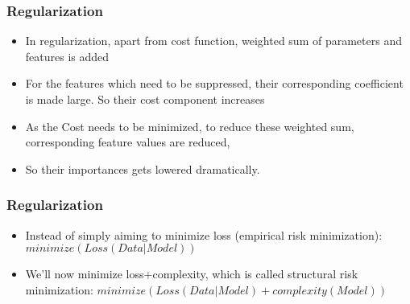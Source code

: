 	

\begin{frame}[fragile]\frametitle{Regularization}
	\begin{itemize}
	\item In regularization, apart from cost function, weighted sum of parameters and features is added
	\item For the features which need to be suppressed, their corresponding coefficient is made large. So their cost component increases
	\item As the Cost needs to be minimized, to reduce these weighted sum, corresponding feature values are reduced, 
	\item So their importances gets lowered dramatically.
	\end{itemize}
\end{frame}



\begin{frame}[fragile]\frametitle{Regularization}


	\begin{itemize}
	\item Instead of simply aiming to minimize loss (empirical risk minimization): $minimize(Loss(Data|Model))$ 
	\item We'll now minimize loss+complexity, which is called structural risk minimization: $minimize(Loss(Data|Model) + complexity(Model))$
	\end{itemize}
	
\end{frame}

